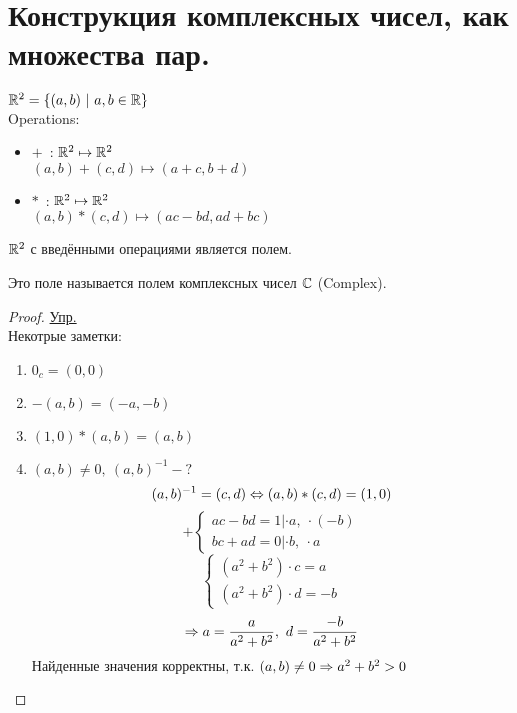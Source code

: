 \section{Конструкция комплексных чисел, как множества пар.}


\begin{flushleft}
$\mathbb{R}^2 = \{(a, b)~|~a, b \in \mathbb{R}\}$ \\
Operations:
\begin{itemize} 
\item $+$~: $\mathbb{R}^2 \mapsto \mathbb{R}^2$ \\
$(a, b) + (c, d) \mapsto (a + c, b + d) $
\item $*$~: $\mathbb{R}^2 \mapsto \mathbb{R}^2$ \\
$(a, b)*(c, d) \mapsto (ac - bd, ad + bc)$
\end{itemize}
\begin{theorem}{}
	$\mathbb{R}^2$ с введёнными операциями является полем.
\end{theorem}
\begin{Def}
	Это поле называется полем комплексных чисел $\mathbb{C}$ (Complex).
\end{Def}
\begin{proof}
	\underline{Упр.} \\
	Некотрые заметки:
	\begin{enumerate}
	\item $0_c = (0, 0)$
	\item $-(a, b) = (-a, -b) $
	\item $(1, 0) * (a, b) = (a, b) $
	\item$ (a, b) \ne 0,~(a, b)^{-1}-?$ \\
	$$(a, b)^{-1} = (c, d) \Leftrightarrow (a, b)*(c, d) = (1, 0)$$
	$$
	+\begin{cases}
	ac - bd = 1 | \cdot a,~\cdot (-b) \\
	bc + ad = 0 | \cdot b,~\cdot a 
	\end{cases}
	$$
	$$
	\begin{cases}
	(a^2 + b^2) \cdot c = a \\
	(a^2 + b^2) \cdot d = -b
	\end{cases}
	$$
	$$ \Rightarrow a = \frac{a}{a^2 + b^2},~d = \frac{-b}{a^2 + b^2}$$
	Найденные значения корректны, т.к. $(a, b) \ne 0 \Rightarrow a^2 + b^2 > 0$
	\end{enumerate}
\end{proof}

\end{flushleft}
